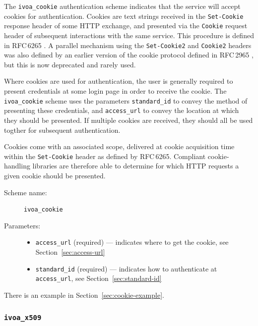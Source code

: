 \documentclass[11pt,a4paper]{ivoa}
\newcommand{\rfc}[1]{RFC\,#1}
\begin{document}
The \verb|ivoa_cookie| authentication scheme indicates that the service
will accept cookies for authentication.
Cookies are text strings received in the {\tt Set-Cookie}
response header of some HTTP exchange,
and presented via the {\tt Cookie} request header of subsequent
interactions with the same service.
This procedure is defined in \rfc{6265} \citep{std:RFC6265}.
A parallel mechanism using the {\tt Set-Cookie2} and {\tt Cookie2}
headers was also defined by an earlier version of the cookie protocol
defined in \rfc{2965} \citep{std:RFC2965},
but this is now deprecated and rarely used.

Where cookies are used for authentication, the user is generally required
to present credentials at some login page in order to receive the cookie.
The \verb|ivoa_cookie| scheme uses the parameters 
\verb|standard_id| to convey the method of presenting these credentials, and
\verb|access_url| to convey the location at which they should be presented.
If multiple cookies are received, they should all be used togther
for subsequent authentication.

Cookies come with an associated scope,
delivered at cookie acquisition time within the {\tt Set-Cookie} header
as defined by \rfc{6265}.
Compliant cookie-handling libraries are therefore able to determine
for which HTTP requests a given cookie should be presented.

\begin{description}
  \item[Scheme name:] \verb|ivoa_cookie|
  \item[Parameters:] \mbox{}
  \begin{itemize}
    \item \verb|access_url| (required) ---
          indicates where to get the cookie,
          see Section~\ref{sec:access-url}
    \item \verb|standard_id| (required) ---
          indicates how to authenticate at \verb|access_url|,
          see Section~\ref{sec:standard-id}
  \end{itemize}
\end{description}

There is an example in Section~\ref{sec:cookie-example}.


\subsubsection{\mbox{\tt ivoa\_x509}}\label{sec:ivoa-x509}

\end{document}
